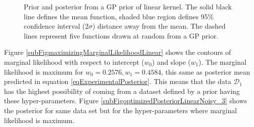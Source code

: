 \begin{figure}[!ht]
  \centering
    \quad
{}\quad

       \caption{Prior and posterior from a GP prior of linear kernel. The solid black line defines the mean function, shaded blue region defines 95\% confidence interval (2$\sigma$) distance away from the mean. The dashed lines represent five functions drawn at random from a GP prior.}
       \label{figPriorAndPosteriorLinearKernel}
\end{figure}

\begin{mdframed}[hidealllines=true,backgroundcolor=lightgray!20]
Figure \ref{subFigmaximizingMarginalLikelihoodLinear} shows the contours of marginal likelihood with respect to intercept ($w_{0}$) and slope ($w_{1}$). The marginal likelihood is maximum for $w_{0} = 0.2576, w_{1} = 0.4584$, this same as posterior mean predicted in equation \ref{eqExperimentalPosterior}. This means that the data $\mathcal{D}_{1}$ has the highest possibility of coming from a dataset defined by a prior having these hyper-parameters. Figure \ref{subFigoptimizedPosteriorLinearNoisy_3} shows the posterior for same data set but for the hyper-parameters where marginal likelihood is maximum.
\end{mdframed}


